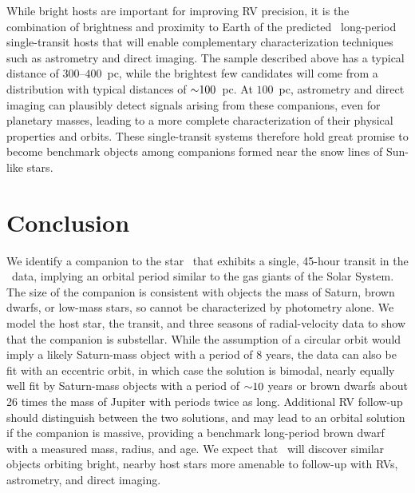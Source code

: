 \documentclass[twocolumn]{aastex63}
\begin{document}
While bright hosts are important for improving RV precision, it is the combination of brightness and proximity to Earth of the predicted \tess\ long-period single-transit hosts that will enable complementary characterization techniques such as astrometry and direct imaging. The sample described above has a typical distance of $300$--$400$\ pc, while the brightest few candidates will come from a distribution with typical distances of $\mathord{\sim} 100$\ pc. At $100$\ pc, astrometry and direct imaging can plausibly detect signals arising from these companions, even for planetary masses, leading to a more complete characterization of their physical properties and orbits. These single-transit systems therefore hold great promise to become benchmark objects among companions formed near the snow lines of Sun-like stars.

\section{Conclusion}
\label{sec:conclusion}

We identify a companion to the star \thisstar\ that exhibits a single, 45-hour transit in the \kep\ data, implying an orbital period similar to the gas giants of the Solar System. The size of the companion is consistent with objects the mass of Saturn, brown dwarfs, or low-mass stars, so cannot be characterized by photometry alone. We model the host star, the transit, and three seasons of radial-velocity data to show that the companion is substellar. While the assumption of a circular orbit would imply a likely Saturn-mass object with a period of 8 years, the data can also be fit with an eccentric orbit, in which case the solution is bimodal, nearly equally well fit by Saturn-mass objects with a period of $\mathord{\sim} 10$ years or brown dwarfs about 26 times the mass of Jupiter with periods twice as long. Additional RV follow-up should distinguish between the two solutions, and may lead to an orbital solution if the companion is massive, providing a benchmark long-period brown dwarf with a measured mass, radius, and age. We expect that \tess\ will discover similar objects orbiting bright, nearby host stars more amenable to follow-up with RVs, astrometry, and direct imaging.


\end{document}
